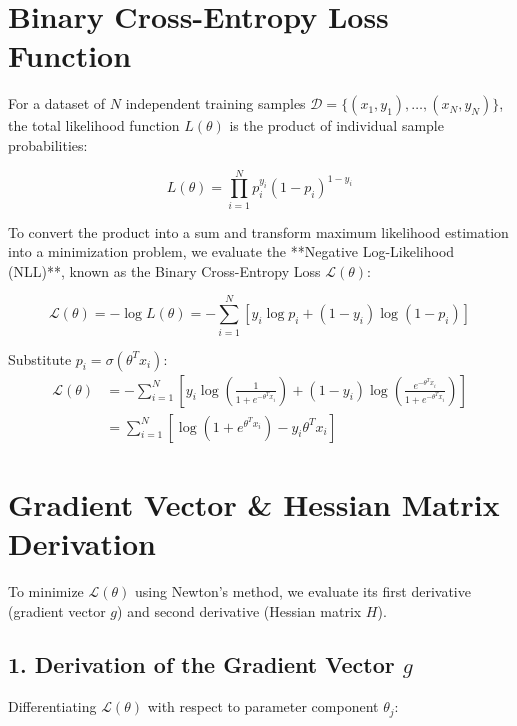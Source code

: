 \section{Binary Cross-Entropy Loss Function}
For a dataset of $N$ independent training samples $\mathcal{D} = \{(x_1, y_1), \dots, (x_N, y_N)\}$, the total likelihood function $L(\theta)$ is the product of individual sample probabilities:

\begin{equation}
L(\theta) = \prod_{i=1}^N p_i^{y_i} (1 - p_i)^{1 - y_i}
\end{equation}

To convert the product into a sum and transform maximum likelihood estimation into a minimization problem, we evaluate the **Negative Log-Likelihood (NLL)**, known as the Binary Cross-Entropy Loss $\mathcal{L}(\theta)$:

\begin{equation}
\mathcal{L}(\theta) = -\log L(\theta) = -\sum_{i=1}^N \left[ y_i \log p_i + (1 - y_i) \log(1 - p_i) \right]
\end{equation}

Substitute $p_i = \sigma(\theta^T x_i)$:
\begin{align}
\mathcal{L}(\theta) &= -\sum_{i=1}^N \left[ y_i \log\left(\frac{1}{1+e^{-\theta^T x_i}}\right) + (1-y_i)\log\left(\frac{e^{-\theta^T x_i}}{1+e^{-\theta^T x_i}}\right) \right] \\
&= \sum_{i=1}^N \left[ \log(1 + e^{\theta^T x_i}) - y_i \theta^T x_i \right]
\end{align}

\section{Gradient Vector \& Hessian Matrix Derivation}
To minimize $\mathcal{L}(\theta)$ using Newton's method, we evaluate its first derivative (gradient vector $g$) and second derivative (Hessian matrix $H$).

\subsection{1. Derivation of the Gradient Vector $g$}
Differentiating $\mathcal{L}(\theta)$ with respect to parameter component $\theta_j$:

